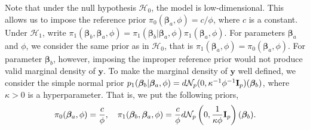 \documentclass[11pt]{article}
\newcommand{\By}{\mathbf{y}}    \newcommand{\Bz}{\mathbf{z}}
\newcommand{\bfsym}[1]{\ensuremath{\boldsymbol{#1}}}
\def\bbeta{\bfsym \beta}
\theoremstyle{plain}
\theoremstyle{definition}
\theoremstyle{remark}
\begin{document}
Note that under the null hypothesis $\mathcal H_0$, the model is low-dimensional.
This allows us to impose the reference prior $\pi_0 (\bbeta_a,\phi)=c/\phi$, where $c$ is a constant.
Under $\mathcal H_1$,
write $\pi_1(\bbeta_b,\bbeta_a,\phi)=\pi_1(\bbeta_b|\bbeta_a,\phi) \pi_1(\bbeta_a,\phi)$.
For parameters $\bbeta_a $ and $\phi$, we consider the same prior as in $\mathcal H_0$, that is $\pi_1(\bbeta_a,\phi)=\pi_0(\bbeta_a,\phi)$.
For parameter $\bbeta_b$, however, imposing the improper reference prior would not produce valid marginal density of $\By$.
To make the marginal density of $\By$ well defined,
we consider the simple normal prior $p_1(\bbeta_b|\bbeta_a, \phi) = d \mathcal N_{p} (0, \kappa^{-1} \phi^{-1} \BI_{p}) (\bbeta_b) $, where $\kappa>0$ is a hyperparameter.
That is, we put the following priors,
\begin{equation}\label{priors}
    \pi_0(\bbeta_a,\phi)= \frac{c}{\phi},\quad
    \pi_1(\bbeta_b,\bbeta_a,\phi)=\frac{c}{\phi} d \mathcal N_{p} \left(0, \frac{1}{\kappa \phi} \BI_{p}\right) (\bbeta_b).
\end{equation}
\end{document}
